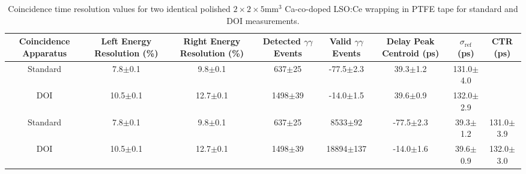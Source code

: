 \begin{table}
\caption{\label{tab:referencevals} Coincidence time resolution values for two identical polished $2\times2\times5$mm$^3$ Ca-co-doped LSO:Ce wrapping in PTFE tape for standard and DOI measurements.}
\begin{tabular}{cccccccc}
Coincidence Apparatus & Left Energy Resolution (\%) & Right Energy Resolution (\%) & Detected $\gamma\gamma$ Events & Valid $\gamma\gamma$ Events & Delay Peak Centroid (ps) & $\sigma_\textrm{ref}$ (ps) & CTR (ps)\\
\hline
Standard &   7.8$\pm$0.1 &   9.8$\pm$0.1 &   637$\pm$25 &  -77.5$\pm$2.3 &   39.3$\pm$1.2 &  131.0$\pm$4.0 \\
     DOI &  10.5$\pm$0.1 &  12.7$\pm$0.1 &  1498$\pm$39 &  -14.0$\pm$1.5 &   39.6$\pm$0.9 &  132.0$\pm$2.9 \\

Standard &   7.8$\pm$0.1 &   9.8$\pm$0.1 &   637$\pm$25 &    8533$\pm$92 &  -77.5$\pm$2.3 &   39.3$\pm$1.2 &  131.0$\pm$3.9 \\
     DOI &  10.5$\pm$0.1 &  12.7$\pm$0.1 &  1498$\pm$39 &  18894$\pm$137 &  -14.0$\pm$1.6 &   39.6$\pm$0.9 &  132.0$\pm$3.0 \\
\hline
\end{tabular}
\end{table}
